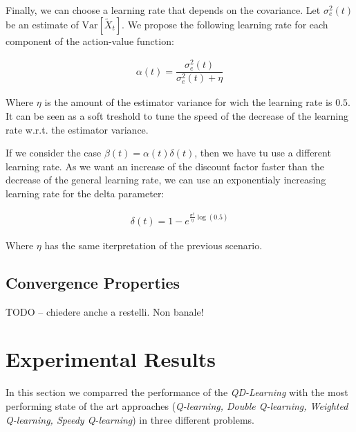 \documentclass[conference]{IEEEtran}
\begin{document}
Finally, we can choose a learning rate that depends on the covariance. Let $\sigma_e^2(t)$ be an estimate of $\mathrm{Var}\left[\widetilde{X}_{t}\right]$. We propose the following learning rate for each component of the action-value function:

\begin{align}
 \alpha(t)=\dfrac{\sigma_e^2(t)}{\sigma_e^2(t)+\eta}
\end{align}

Where $\eta$ is the amount of the estimator variance for wich the learning rate is $0.5$. It can be seen as a soft treshold to tune the speed of the decrease of the learning rate w.r.t. the estimator variance.

If we consider the case $\beta(t)=\alpha(t)\delta(t)$, then we have tu use a different learning rate. As we want an increase of the discount factor faster than the decrease of the general learning rate, we can use an exponentialy increasing learning rate for the delta parameter:

\begin{align}
 \delta(t) = 1- e^{\frac{\sigma^2}{\eta}\log(0.5)}
\end{align}

Where $\eta$ has the same iterpretation of the previous scenario.


\subsection{Convergence Properties}

TODO -- chiedere anche a restelli. Non banale!


\section{Experimental Results}
In this section we comparred the performance of the \emph{QD-Learning} with the most performing state of the art approaches (\emph{Q-learning,  Double Q-learning, Weighted Q-learning, Speedy Q-learning}) in three different problems.
\end{document}
